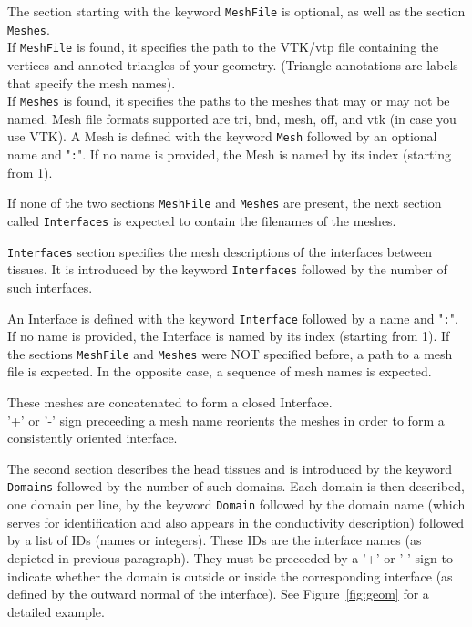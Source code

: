 \documentclass[10pt,journal]{book}
\begin{document}
    \medskip
    The section starting with the keyword {\tt MeshFile} is optional, as well as the section {\tt Meshes}.\\
    If {\tt MeshFile} is found, it specifies the path to the VTK/vtp file containing the vertices and annoted triangles of your geometry. (Triangle annotations are labels that specify the mesh names).\\
    If {\tt Meshes} is found, it specifies the paths to the meshes that may or may not be named. Mesh file formats supported are tri, bnd, mesh, off, and vtk (in case you use VTK).
    A Mesh is defined with the keyword {\tt Mesh} followed by an optional name and "{\tt :}".
    If no name is provided, the Mesh is named by its index (starting from 1).
    
    If none of the two sections {\tt MeshFile} and {\tt Meshes} are present, the next section called {\tt Interfaces} is expected to contain the filenames of the meshes.

    \medskip

    {\tt Interfaces} section specifies the mesh descriptions of the interfaces between tissues. 
    It is introduced by the keyword {\tt Interfaces} followed by the number of such interfaces.

    An Interface is defined with the keyword {\tt Interface} followed by a name and "{\tt :}".
    If no name is provided, the Interface is named by its index (starting from 1).
    If the sections {\tt MeshFile} and {\tt Meshes} were NOT specified before, a path to a mesh file is expected.
    In the opposite case, a sequence of mesh names is expected.

    These meshes are concatenated to form a closed Interface. \\
    '+' or '-' sign preceeding a mesh name reorients the meshes in order to form a consistently oriented interface.

    \medskip

    The second section describes the head tissues and is introduced by the keyword {\tt Domains} followed by the number of such domains.
    Each domain is then described, one domain per line, by the keyword {\tt Domain} followed by the domain name (which serves for identification and also appears in the conductivity description) followed by a list of IDs (names or integers).
    These IDs are the interface names (as depicted in previous paragraph). 
    They must be preceeded by a '+' or '-' sign to indicate whether the domain is outside or inside the corresponding interface (as defined by the outward normal of the interface).
    See Figure~\ref{fig:geom} for a detailed example.
\end{document}
